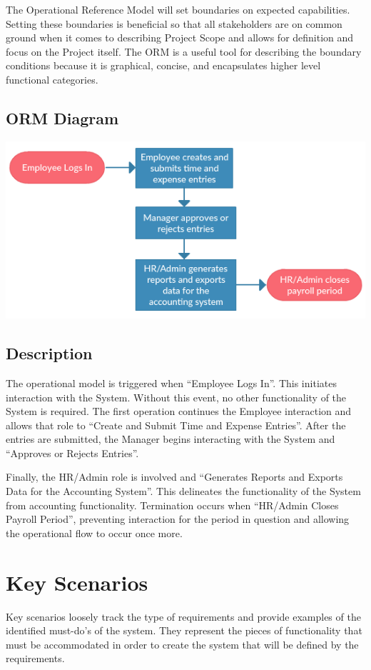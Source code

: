 \documentclass[12pt]{article}
\begin{document}
The Operational Reference Model will set boundaries on expected capabilities. Setting these boundaries is beneficial so that all stakeholders are on common ground when it comes to describing Project Scope and allows for definition and focus on the Project itself. The ORM is a useful tool for describing the boundary conditions because it is graphical, concise, and encapsulates higher level functional categories.

\subsection{ORM Diagram}

\begin{center}
	\includegraphics[scale=.85]{Graphs/ORM}
\end{center}

\subsection{Description}

The operational model is triggered when “Employee Logs In”. This initiates interaction with the System. Without this event, no other functionality of the System is required. The first operation continues the Employee interaction and allows that role to “Create and Submit Time and Expense Entries”. After the entries are submitted, the Manager begins interacting with the System and “Approves or Rejects Entries”.

Finally, the HR/Admin role is involved and “Generates Reports and Exports Data for the Accounting System”. This delineates the functionality of the System from accounting functionality. Termination occurs when “HR/Admin Closes Payroll Period”, preventing interaction for the period in question and allowing the operational flow to occur once more.

\section{Key Scenarios}
Key scenarios loosely track the type of requirements and provide examples of the identified must-do's of the system. They represent the pieces of functionality that must be accommodated in order to create the system that will be defined by the requirements. 
\end{document}
